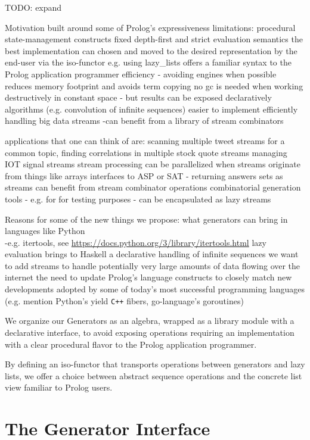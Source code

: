 \documentclass{new_tlp}
\begin{document}
{\Large TODO: expand}

Motivation built around some of Prolog's expressiveness limitations:
\BI
\I procedural state-management constructs
\I fixed depth-first and strict evaluation semantics
\I the best implementation can chosen and moved to the desired representation by the end-user via the iso-functor
e.g. using lazy\_lists offers a familiar syntax to the Prolog application programmer
\I efficiency - avoiding engines when possible reduces memory footprint and avoids term copying
\I no gc is needed when working destructively in constant space - but results can be exposed declaratively
\I algorithms (e.g. convolution of infinite sequences) easier to implement efficiently
\I handling big data streams -can benefit from a library of stream combinators


\I  applications that one can think of are:
\BI
\I scanning multiple tweet streams for a common topic, 
\I finding correlations in multiple stock quote streams 
\I managing IOT signal streams
\I stream processing  can be parallelized when streams originate from things like arrays
\I interfaces to ASP or SAT - returning answers sets as streams can benefit from stream combinator operations
\I combinatorial generation tools - e.g. for for testing purposes - can be encapsulated as lazy streams
\EI
\EI

Reasons for some of the new things we propose:
\BI
\I what generators can bring in languages like Python \\-e.g. itertools, 
see \url{https://docs.python.org/3/library/itertools.html}
\I lazy evaluation brings to Haskell a declarative handling of infinite sequences
\I we want to add streams to
handle potentially very large amounts of data flowing over the internet
\I the need to update Prolog's language constructs to closely match new developments adopted by some of today's most successful programming languages (e.g. mention Python's yield \verb~C++~ fibers, go-language's goroutines)
\EI

We organize our Generators as an algebra, wrapped as a library module with a declarative interface, to avoid exposing  operations requiring an implementation with a clear procedural flavor to the Prolog application programmer.

By defining an iso-functor that transports operations between
generators and lazy lists, we offer a choice between 
abstract sequence operations and the concrete list view familiar to Prolog users.


\section{The Generator Interface}
\end{document}
